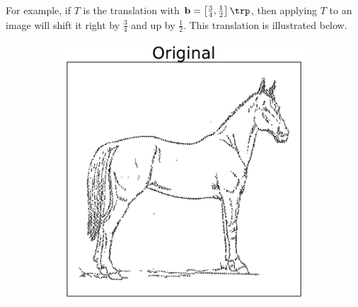 For example, if $T$ is the translation with $\mathbf{b} = \left[\frac{3}{4}, \frac{1}{2}\right]\trp$, then applying $T$ to an image will shift it right by $\frac{3}{4}$ and up by $\frac{1}{2}$.
This translation is illustrated below.

\begin{figure}[H] %
\captionsetup[subfigure]{justification=centering}
\centering
\begin{subfigure}{.32\textwidth}
    \centering
    \includegraphics[width=\linewidth]{figures/OriginalHorse.pdf}
\end{subfigure}%
\begin{subfigure}{.32\textwidth}
    \centering

\end{subfigure}
\end{figure}
